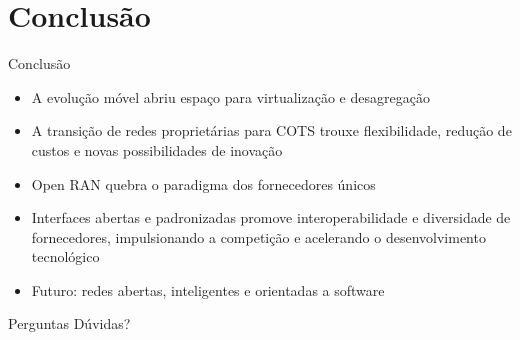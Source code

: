 \section{Conclusão}

\begin{frame}{Conclusão}
\begin{itemize}
  \item A evolução móvel abriu espaço para virtualização e desagregação
  \item A transição de redes proprietárias para COTS trouxe flexibilidade, redução de custos e novas possibilidades de inovação
  \item Open RAN quebra o paradigma dos fornecedores únicos
  \item Interfaces abertas e padronizadas promove interoperabilidade e diversidade de fornecedores, impulsionando a competição e acelerando o desenvolvimento tecnológico
  \item Futuro: redes abertas, inteligentes e orientadas a software
\end{itemize}
\end{frame}

\begin{frame}{Perguntas}
\centering
\Large Dúvidas?
\end{frame}